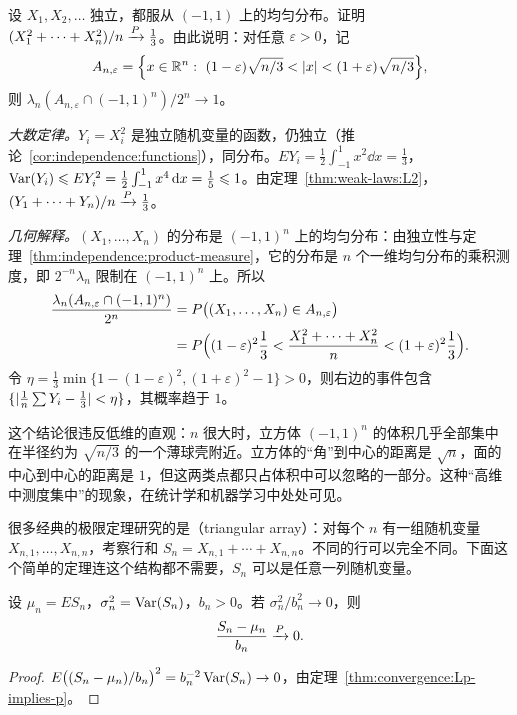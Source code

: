 \begin{workedexample}[高维立方体几乎全在一个球壳上]\label{we:weak-laws:cube}
设 $X_1,X_2,\dots$ 独立，都服从 $(-1,1)$ 上的均匀分布。证明 $(X_1^2+\cdots+X_n^2)/n\xrightarrow{P}\frac13$。由此说明：对任意 $\varepsilon>0$，记
\[
A_{n,\varepsilon}=\Bigl\{x\in\R^n:\ (1-\varepsilon)\sqrt{n/3}<\abs x<(1+\varepsilon)\sqrt{n/3}\Bigr\},
\]
则 $\lambda_n(A_{n,\varepsilon}\cap(-1,1)^n)/2^n\to1$。
\end{workedexample}
\begin{solution}
\emph{大数定律。}$Y_i=X_i^2$ 是独立随机变量的函数，仍独立（推论~\ref{cor:independence:functions}），同分布。$EY_i=\frac12\int_{-1}^1x^2\dd x=\frac13$，$\operatorname{Var}(Y_i)\leqslant EY_i^2=\frac12\int_{-1}^1x^4\,\mathrm{d} x=\frac15\leqslant1$。由定理~\ref{thm:weak-laws:L2}，$(Y_1+\cdots+Y_n)/n\xrightarrow{P}\frac13$。

\emph{几何解释。}$(X_1,\dots,X_n)$ 的分布是 $(-1,1)^n$ 上的均匀分布：由独立性与定理~\ref{thm:independence:product-measure}，它的分布是 $n$ 个一维均匀分布的乘积测度，即 $2^{-n}\lambda_n$ 限制在 $(-1,1)^n$ 上。所以
\[
\begin{aligned}
\frac{\lambda_n(A_{n,\varepsilon}\cap(-1,1)^n)}{2^n}&=P\bigl((X_1,\dots,X_n)\in A_{n,\varepsilon}\bigr)\\
&=P\Bigl((1-\varepsilon)^2\frac13<\frac{X_1^2+\cdots+X_n^2}n<(1+\varepsilon)^2\frac13\Bigr).
\end{aligned}
\]
令 $\eta=\frac13\min\{1-(1-\varepsilon)^2,(1+\varepsilon)^2-1\}>0$，则右边的事件包含 $\{\lvert \frac1n\sum Y_i-\frac13\rvert<\eta\}$，其概率趋于 $1$。

这个结论很违反低维的直观：$n$ 很大时，立方体 $(-1,1)^n$ 的体积几乎全部集中在半径约为 $\sqrt{n/3}$ 的一个薄球壳附近。立方体的“角”到中心的距离是 $\sqrt n$，面的中心到中心的距离是 $1$，但这两类点都只占体积中可以忽略的一部分。这种“高维中测度集中”的现象，在统计学和机器学习中处处可见。
\end{solution}


很多经典的极限定理研究的是（triangular array）：对每个 $n$ 有一组随机变量 $X_{n,1},\dots,X_{n,n}$，考察行和 $S_n=X_{n,1}+\cdots+X_{n,n}$。不同的行可以完全不同。下面这个简单的定理连这个结构都不需要，$S_n$ 可以是任意一列随机变量。

\begin{theorem}\label{thm:weak-laws:triangular-L2}
设 $\mu_n=ES_n$，$\sigma_n^2=\operatorname{Var}(S_n)$，$b_n>0$。若 $\sigma_n^2/b_n^2\to0$，则
\[
\frac{S_n-\mu_n}{b_n}\xrightarrow{P}0 .
\]
\end{theorem}
\begin{proof}
$E\bigl((S_n-\mu_n)/b_n\bigr)^2=b_n^{-2}\operatorname{Var}(S_n)\to0$，由定理~\ref{thm:convergence:Lp-implies-p}。
\end{proof}

